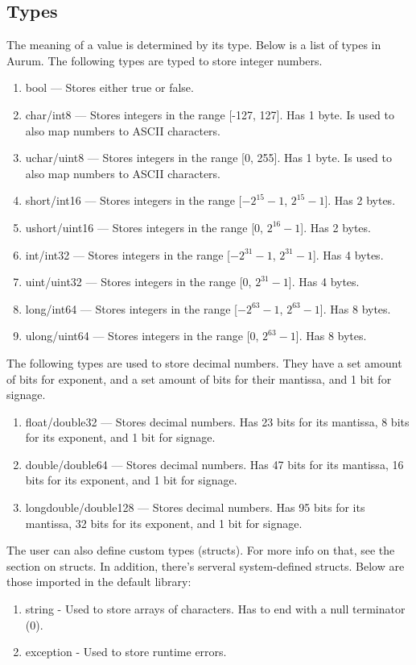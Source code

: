 \documentclass[12pt, letterpaper, oneside]{article}
\begin{document}
	\subsection{Types}
	The meaning of a value is determined by its type. Below is a list of types in Aurum.
	The following types are typed to store integer numbers.
	\begin{enumerate}
		\item bool --- Stores either true or false.
		\item char/int8 --- Stores integers in the range [-127, 127]. Has 1 byte. Is used to also map numbers to ASCII characters.
		\item uchar/uint8 --- Stores integers in the range [0, 255]. Has 1 byte. Is used to also map numbers to ASCII characters.
		\item short/int16 --- Stores integers in the range [$-{2^{15}-1}$, $2^{15}-1$]. Has 2 bytes.
		\item ushort/uint16 --- Stores integers in the range [0, $2^{16}-1$]. Has 2 bytes.
		\item int/int32 --- Stores integers in the range [$-{2^{31}-1}$, $2^{31}-1$]. Has 4 bytes.
		\item uint/uint32 --- Stores integers in the range [0, $2^{31}-1$]. Has 4 bytes.
		\item long/int64 --- Stores integers in the range [$-{2^{63}-1}$, $2^{63}-1$]. Has 8 bytes.
		\item ulong/uint64 --- Stores integers in the range [0, $2^{63}-1$]. Has 8 bytes.
	\end{enumerate}
	The following types are used to store decimal numbers. They have a set amount of bits for exponent, and a set amount of bits for their mantissa, and 1 bit for signage.
	\begin{enumerate}
		\item float/double32 --- Stores decimal numbers. Has 23 bits for its mantissa, 8 bits for its exponent, and 1 bit for signage.
		\item double/double64 --- Stores decimal numbers. Has 47 bits for its mantissa, 16 bits for its exponent, and 1 bit for signage.
		\item longdouble/double128 --- Stores decimal numbers. Has 95 bits for its mantissa, 32 bits for its exponent, and 1 bit for signage.
	\end{enumerate}
	The user can also define custom types (structs). For more info on that, see the section on structs.
	In addition, there's serveral system-defined structs. Below are those imported in the default library:
	\begin{enumerate}
		\item string - Used to store arrays of characters. Has to end with a null terminator (0).
		\item exception - Used to store runtime errors.
	\end{enumerate}
\end{document}
